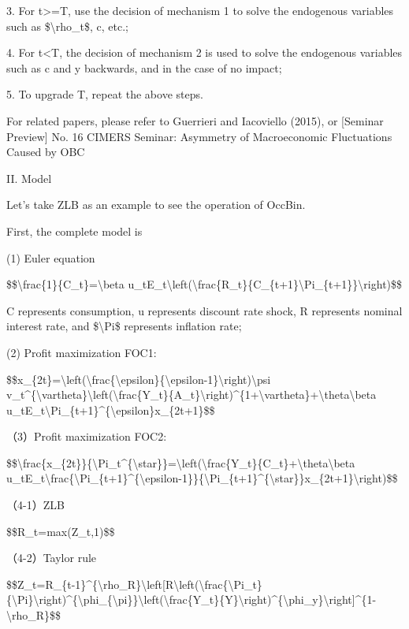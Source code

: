 \documentclass[10pt,math=newtx,citestyle=gb7714-2015,bibstyle=gb7714-2015]{elegantbook}
\begin{document}
	3. For t>=T, use the decision of mechanism 1 to solve the endogenous variables such as \$\textbackslash{}rho\_t\$, c, etc.;
	
	4. For t<T, the decision of mechanism 2 is used to solve the endogenous variables such as c and y backwards, and in the case of no impact;
	
	5. To upgrade T, repeat the above steps.
	
	
	For related papers, please refer to Guerrieri and Iacoviello (2015), or [Seminar Preview] No. 16 CIMERS Seminar: Asymmetry of Macroeconomic Fluctuations Caused by OBC
	
	II. Model
	
	Let's take ZLB as an example to see the operation of OccBin.
	
	First, the complete model is
	
	(1) Euler equation
	
	\$\$\textbackslash{}frac\{1\}\{C\_t\}=\textbackslash{}beta u\_tE\_t\textbackslash{}left(\textbackslash{}frac\{R\_t\}\{C\_\{t+1\}\textbackslash{}Pi\_\{t+1\}\}\textbackslash{}right)\$\$
	
	C represents consumption, u represents discount rate shock, R represents nominal interest rate, and \$\textbackslash{}Pi\$ represents inflation rate;
	
	(2) Profit maximization FOC1:
	
	\$\$x\_\{2t\}=\textbackslash{}left(\textbackslash{}frac\{\textbackslash{}epsilon\}\{\textbackslash{}epsilon-1\}\textbackslash{}right)\textbackslash{}psi v\_t\^{}\{\textbackslash{}vartheta\}\textbackslash{}left(\textbackslash{}frac\{Y\_t\}\{A\_t\}\textbackslash{}right)\^{}\{1+\textbackslash{}vartheta\}+\textbackslash{}theta\textbackslash{}beta u\_tE\_t\textbackslash{}Pi\_\{t+1\}\^{}\{\textbackslash{}epsilon\}x\_\{2t+1\}\$\$
	
	
	（3）Profit maximization FOC2:
	
	\$\$\textbackslash{}frac\{x\_\{2t\}\}\{\textbackslash{}Pi\_t\^{}\{\textbackslash{}star\}\}=\textbackslash{}left(\textbackslash{}frac\{Y\_t\}\{C\_t\}+\textbackslash{}theta\textbackslash{}beta u\_tE\_t\textbackslash{}frac\{\textbackslash{}Pi\_\{t+1\}\^{}\{\textbackslash{}epsilon-1\}\}\{\textbackslash{}Pi\_\{t+1\}\^{}\{\textbackslash{}star\}\}x\_\{2t+1\}\textbackslash{}right)\$\$
	
	
	（4-1）ZLB
	
	\$\$R\_t=max(Z\_t,1)\$\$
	
	（4-2）Taylor rule
	
	\$\$Z\_t=R\_\{t-1\}\^{}\{\textbackslash{}rho\_R\}\textbackslash{}left[R\textbackslash{}left(\textbackslash{}frac\{\textbackslash{}Pi\_t\}\{\textbackslash{}Pi\}\textbackslash{}right)\^{}\{\textbackslash{}phi\_\{\textbackslash{}pi\}\}\textbackslash{}left(\textbackslash{}frac\{Y\_t\}\{Y\}\textbackslash{}right)\^{}\{\textbackslash{}phi\_y\}\textbackslash{}right]\^{}\{1-\textbackslash{}rho\_R\}\$\$
	
\end{document}
